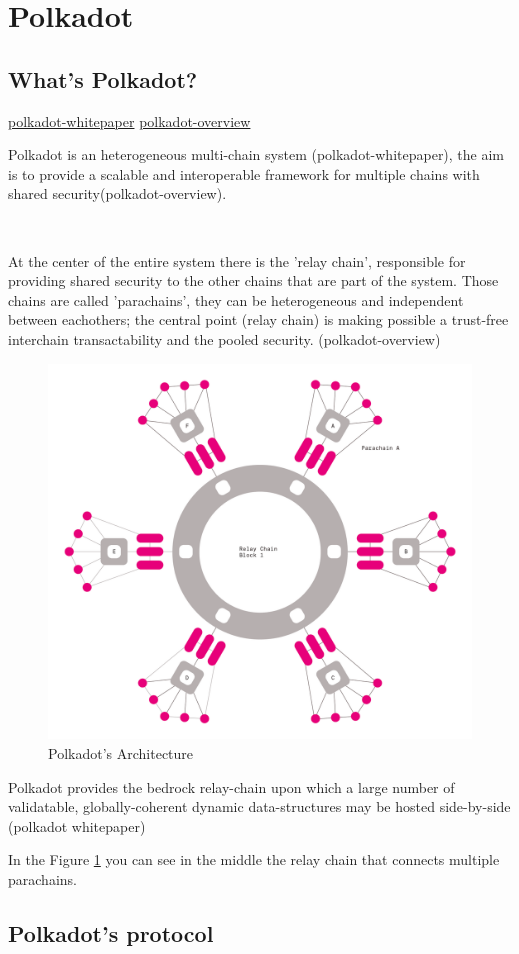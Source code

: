 \documentclass[../main.tex]{subfiles}
\begin{document}
\section{Polkadot}
\subsection{What's Polkadot?}
\href{https://assets.polkadot.network/Polkadot-whitepaper.pdf}{polkadot-whitepaper}
\href{https://arxiv.org/pdf/2005.13456.pdf}{polkadot-overview}

Polkadot is an heterogeneous multi-chain system (polkadot-whitepaper), the aim is to provide a scalable and interoperable framework for multiple chains with shared security(polkadot-overview).

\

At the center of the entire system there is the 'relay chain', responsible for providing shared security to the other chains that are part of the system. Those chains are called 'parachains', they can be heterogeneous and independent between eachothers; the central point (relay chain) is making possible a trust-free interchain transactability and the pooled security. (polkadot-overview)

\begin{figure}
  \centering
  \includegraphics[width=0.4\linewidth]{polkadot_architecture.png}
  \caption{Polkadot's Architecture}
  \label{fig:polkadot_arch}
\end{figure}

Polkadot provides the bedrock relay-chain upon which a large number of validatable, globally-coherent dynamic data-structures may be hosted side-by-side (polkadot whitepaper)

In the Figure \ref{fig:polkadot_arch} you can see in the middle the relay chain that connects multiple parachains.

\subsection{Polkadot's protocol}
\end{document}
